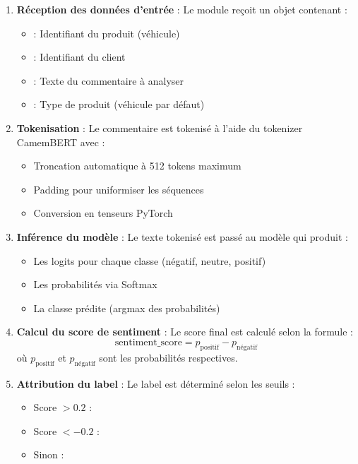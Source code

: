 \documentclass[11pt,a4paper]{report}
\begin{document}
\begin{enumerate}
    \item \textbf{Réception des données d'entrée} : Le module reçoit un objet  contenant :
    \begin{itemize}
        \item {} : Identifiant du produit (véhicule)
        \item {} : Identifiant du client
        \item {} : Texte du commentaire à analyser
        \item {} : Type de produit (véhicule par défaut)
    \end{itemize}

    \item \textbf{Tokenisation} : Le commentaire est tokenisé à l'aide du tokenizer CamemBERT avec :
    \begin{itemize}
        \item Troncation automatique à 512 tokens maximum
        \item Padding pour uniformiser les séquences
        \item Conversion en tenseurs PyTorch
    \end{itemize}

    \item \textbf{Inférence du modèle} : Le texte tokenisé est passé au modèle qui produit :
    \begin{itemize}
        \item Les logits pour chaque classe (négatif, neutre, positif)
        \item Les probabilités via Softmax
        \item La classe prédite (argmax des probabilités)
    \end{itemize}

    \item \textbf{Calcul du score de sentiment} : Le score final est calculé selon la formule :
    \begin{equation}
        \text{sentiment\_score} = p_{\text{positif}} - p_{\text{négatif}}
        \label{eq:sentiment_score}
    \end{equation}
    où $p_{\text{positif}}$ et $p_{\text{négatif}}$ sont les probabilités respectives.

    \item \textbf{Attribution du label} : Le label est déterminé selon les seuils :
    \begin{itemize}
        \item Score $> 0.2$ : 
        \item Score $< -0.2$ : 
        \item Sinon : 
    \end{itemize}
\end{enumerate}
\end{document}
